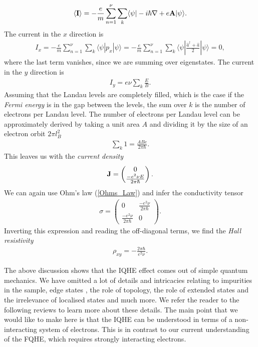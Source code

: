 \begin{align}
     \langle {\bf I} \rangle = - \frac{e}{m} \sum_{n=1}^{\nu} \sum_{k}  \langle \psi |-i \hbar \nabla +e \bf{A} |\psi \rangle.
\end{align}
  The current in the $x$ direction is 
\begin{align}
     I_x = -\frac{e}{m} \sum_{n=1}^{\nu} \sum_{k} \langle \psi|p_x | \psi \rangle= -\frac{e}{m} \sum_{n=1}^{\nu} \sum_{k} \langle \psi| \frac{\hat{a}^{\dagger}+ \hat{a}}{2} | \psi \rangle=0,
\end{align}
where the last term vanishes, since we are summing over eigenstates.
 The current in the $y$ direction is
\begin{align}
     I_y = e \nu \sum_{k} \frac{E}{B}.
\end{align}
  Assuming that the Landau levels are completely filled, which is the case if the \textit{Fermi energy} is in the gap between the levels, the sum over $k$ is the number of electrons per Landau level. The number of electrons per Landau level can be approximately derived by taking a unit area $A$ and dividing it by the size of an electron orbit $2 \pi l_B^2$ 
\begin{align}
     \sum_{k}1 =  \frac{A B e}{2 \pi \hbar}.
\end{align}
  This leaves us with the \textit{current density}
\begin{align}
    {\bf J} = \begin{pmatrix} 
0\\
        \frac{-e^2 \nu E}{2 \pi \hbar}
    \end{pmatrix}.
\end{align}
  We can again use Ohm's law (\ref{Ohms_Law}) and infer the conductivity tensor
\begin{align}
      \sigma = \begin{pmatrix}
        0&\frac{- e^2 \nu }{2\pi \hbar}\\
        \frac{- e^2 \nu }{2\pi \hbar}&0
    \end{pmatrix}.
\end{align}
  Inverting this expression and reading the off-diagonal terms, we find the \textit{Hall resistivity} 
\begin{align}
     \rho_{xy} = - \frac{2 \pi \hbar}{e^2 \nu}.
\end{align}


 The above discussion shows that the IQHE effect comes out of simple quantum mechanics. We have omitted a lot of details and intricacies relating to impurities in the sample, edge states \cite{PhysRevB.25.2185}, the role of topology, the role of extended states and the irrelevance of localised states \cite{PhysRevB.23.5632} and much more. We refer the reader to the following reviews \cite{Tong:2016kpv, yoshioka2002the, Girvin} to learn more about these details. The main point that we would like to make here is that the IQHE can be understood in terms of a non-interacting system of electrons. This is in contrast to our current understanding of the FQHE, which requires strongly interacting electrons.


